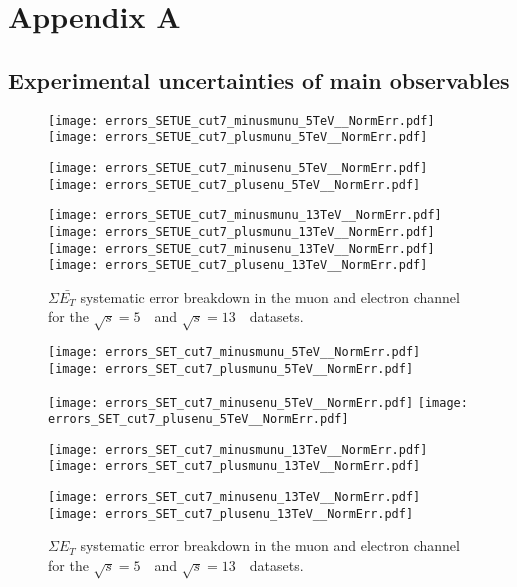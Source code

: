 \chapter{Appendix A}
    
    
\section{Experimental uncertainties of main observables}
\begin{figure}[h]
	\centering
	{\texttt{[image: errors\_SETUE\_cut7\_minusmunu\_5TeV\_\_NormErr.pdf]}\label{f:SETUEmm5}}
	{\texttt{[image: errors\_SETUE\_cut7\_plusmunu\_5TeV\_\_NormErr.pdf]}\label{f:SETUEpm5}}
	
	{\texttt{[image: errors\_SETUE\_cut7\_minusenu\_5TeV\_\_NormErr.pdf]}\label{f:}}
	{\texttt{[image: errors\_SETUE\_cut7\_plusenu\_5TeV\_\_NormErr.pdf]}\label{f:}}
	
	{\texttt{[image: errors\_SETUE\_cut7\_minusmunu\_13TeV\_\_NormErr.pdf]}\label{f:SETUEmm13}}
	{\texttt{[image: errors\_SETUE\_cut7\_plusmunu\_13TeV\_\_NormErr.pdf]}\label{f:SETUEpm13}}
	{\texttt{[image: errors\_SETUE\_cut7\_minusenu\_13TeV\_\_NormErr.pdf]}\label{f:}}
	{\texttt{[image: errors\_SETUE\_cut7\_plusenu\_13TeV\_\_NormErr.pdf]}\label{f:}}
	
	\caption{$\Sigma \bar{E_T}$ systematic error breakdown in the muon and electron channel  for the $\sqrt{s} = 5$~\TeV\ and $\sqrt{s} = 13$~\TeV\ datasets.}
\end{figure}
%

\begin{figure}[h]
	\centering
	{\texttt{[image: errors\_SET\_cut7\_minusmunu\_5TeV\_\_NormErr.pdf]}\label{f:set5}}
	{\texttt{[image: errors\_SET\_cut7\_plusmunu\_5TeV\_\_NormErr.pdf]}\label{f:setpl}}
	
	{\texttt{[image: errors\_SET\_cut7\_minusenu\_5TeV\_\_NormErr.pdf]}\label{f:}}
	{\texttt{[image: errors\_SET\_cut7\_plusenu\_5TeV\_\_NormErr.pdf]}\label{f:}}
	
	{\texttt{[image: errors\_SET\_cut7\_minusmunu\_13TeV\_\_NormErr.pdf]}\label{f:set13}}
	{\texttt{[image: errors\_SET\_cut7\_plusmunu\_13TeV\_\_NormErr.pdf]}\label{f:setpl13}}
	
	{\texttt{[image: errors\_SET\_cut7\_minusenu\_13TeV\_\_NormErr.pdf]}\label{f:}}
	{\texttt{[image: errors\_SET\_cut7\_plusenu\_13TeV\_\_NormErr.pdf]}\label{f:}}
		
	\caption{$\Sigma{E_T}$ systematic error breakdown in the muon and electron channel  for the $\sqrt{s} = 5$~\TeV\ and $\sqrt{s} = 13$~\TeV\ datasets.}
\end{figure}
\newpage


